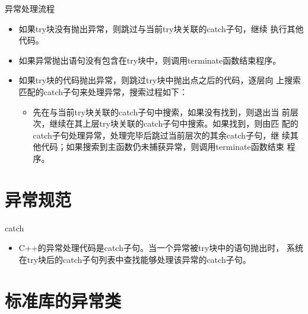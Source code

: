 \begin{frame}[t, fragile]{异常处理流程}%
  \begin{itemize}
  \item 如果try块没有抛出异常，则跳过与当前try块关联的catch子句，继续
    执行其他代码。
  \item 如果异常抛出语句没有包含在try块中，则调用terminate函数结束程序。
  \item 如果try块的代码抛出异常，则跳过try块中抛出点之后的代码，逐层向
    上搜索匹配的catch子句来处理异常，搜索过程如下：
    \begin{itemize}
    \item 先在与当前try块关联的catch子句中搜索，如果没有找到，则退出当
      前层次，继续在其上层try块关联的catch子句中搜索。如果找到，则由匹
      配的catch子句处理异常，处理完毕后跳过当前层次的其余catch子句，继
      续其他代码；如果搜索到主函数仍未捕获异常，则调用terminate函数结束
      程序。
    \end{itemize}
  \end{itemize}
\end{frame}


\section[规范]{异常规范}\label{sec:chap10-sec03}
\begin{frame}[t, fragile]{catch}%
  \begin{itemize}
  \item C++的异常处理代码是catch子句。当一个异常被try块中的语句抛出时，
    系统在try块后的catch子句列表中查找能够处理该异常的catch子句。    
  \end{itemize}  
\end{frame}

\section[异常类]{标准库的异常类}\label{sec:chap10-sec04}

